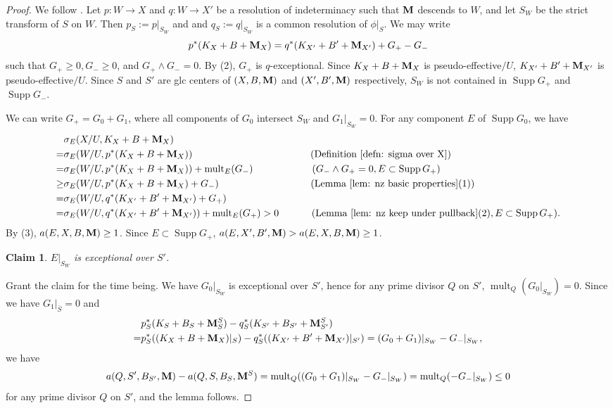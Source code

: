 \documentclass[11pt]{amsart}
\numberwithin{equation}{section}
\newcommand{\Mm}{{\bf{M}}}
\newcommand{\Supp}{\operatorname{Supp}}
\newcommand{\mult}{\operatorname{mult}}
\newtheorem{claim}[thm]{Claim}
\theoremstyle{definition}
\theoremstyle{definition}
\theoremstyle{definition}
\begin{document}
\begin{proof}
We follow \cite[Proof of Lemma 3.5]{Has22}. Let $p: W\rightarrow X$ and $q: W\rightarrow X'$ be a resolution of indeterminacy such that $\Mm$ descends to $W$, and let $S_W$ be the strict transform of $S$ on $W$. Then $p_S:=p|_{S_W}$ and and $q_S:=q|_{S_W}$ is a common resolution of $\phi|_S$. We may write
$$p^*(K_{X}+B+\Mm_{X})=q^*(K_{X'}+B'+\Mm_{X'})+G_{+}-G_{-}$$
such that $G_{+}\geq0,G_{-}\geq0$, and $G_+\wedge G_-=0$. By (2), $G_{+}$ is $q$-exceptional.
Since $K_{X}+B+\Mm_{X}$ is pseudo-effective$/U$, $K_{X'}+B'+\Mm_{X'}$ is pseudo-effective$/U$. Since $S$ and $S'$ are glc centers of $(X,B,\Mm)$ and $(X',B',\Mm)$ respectively, $S_W$ is not contained in $\Supp G_+$ and $\Supp G_-$.

We can write $G_{+}=G_{0}+G_{1}$, where all components of $G_{0}$ intersect $S_W$ and $G_{1}|_{S_W}=0$. For any component $E$ of $\Supp G_0$, we have
\begin{equation*}
\begin{split}
&\sigma_{E}(X/U,K_{X}+B+\Mm_{X})\\
=&\sigma_{E}(W/U,p^*(K_{X}+B+\Mm_{X})) \qquad \qquad \qquad \qquad \qquad \qquad (\text{Definition } \ref{defn: sigma over X})\\
=&\sigma_{E}(W/U,p^*(K_{X}+B+\Mm_{X}))+\mult_E(G_-) \qquad \qquad \ \ \ \ \ \ (G_-\wedge G_+=0, E\subset\Supp G_+)\\
\geq&\sigma_{E}(W/U,p^*(K_{X}+B+\Mm_{X})+G_-) \qquad \qquad \qquad \qquad \quad \ (\text{Lemma }\ref{lem: nz basic properties}(1))\\
=&\sigma_{E}(W/U,q^{*}(K_{X'}+B'+\Mm_{X'})+G_{+}) \\
=& \sigma_{E}(W/U,q^{*}(K_{X'}+B'+\Mm_{X'}))+\mult_{E}(G_{+})>0 \qquad \ \ \ \ (\text{Lemma }\ref{lem: nz keep under pullback}(2), E\subset\Supp G_+).
\end{split}
\end{equation*}
By (3), $a(E,X,B,\Mm)\geq 1$. Since $E\subset\Supp G_+$, $a(E,X',B',\Mm)>a(E,X,B,\Mm)\geq 1$.

\begin{claim}\label{claim: has 22 3.5 lemma followed proof}
$E|_{S_W}$ is exceptional over $S'$.
\end{claim}

Grant the claim for the time being. We have $G_0|_{S_W}$ is exceptional over $S'$, hence for any prime divisor $Q$ on $S'$, $\mult_Q(G_0|_{S_W})=0$. Since we have $G_{1}|_{\bar{S}}=0$ and
\begin{align*}
    &p_S^{*}(K_S+B_S+\Mm^S_S)-q_S^{*}(K_{S'}+B_{S'}+\Mm^S_{S'})\\
    =&p_S^{*}((K_X+B+\Mm_X)|_{S})-q_S^{*}((K_{X'}+B'+\Mm_{X'})|_{S'})=
    (G_{0}+G_{1})|_{S_W}-G_{-}|_{S_W},
\end{align*}
we have
$$a(Q,S',B_{S'},\Mm)-a(Q,S,B_S,\Mm^S)=\mult_Q((G_{0}+G_{1})|_{S_W}-G_{-}|_{S_W})=\mult_Q(-G_-|_{S_W})\leq 0$$
for any prime divisor $Q$ on $S'$, and the lemma follows.
\end{proof}
\end{document}
